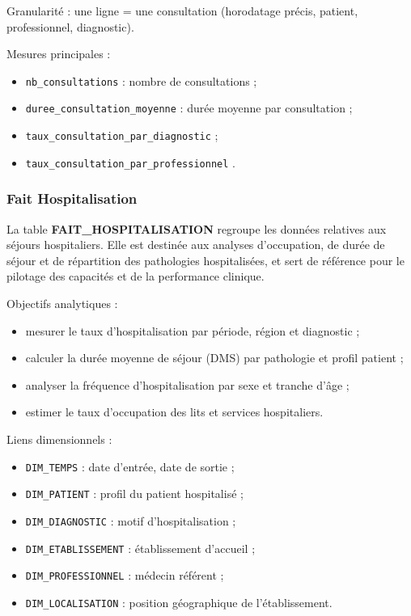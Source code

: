 \documentclass[12pt,a4paper]{article}
\begin{document}
Granularité : une ligne = une consultation (horodatage précis, patient, professionnel, diagnostic).

Mesures principales :
\begin{itemize}
    \item \texttt{nb\_consultations} : nombre de consultations ;
    \item \texttt{duree\_consultation\_moyenne} : durée moyenne par consultation ;
    \item \texttt{taux\_consultation\_par\_diagnostic} ;
    \item \texttt{taux\_consultation\_par\_professionnel} .
\end{itemize}

\subsubsection{Fait Hospitalisation}

La table \textbf{FAIT\_HOSPITALISATION} regroupe les données relatives aux séjours hospitaliers. Elle est destinée aux analyses d’occupation, de durée de séjour et de répartition des pathologies hospitalisées, et sert de référence pour le pilotage des capacités et de la performance clinique.

Objectifs analytiques :
\begin{itemize}
    \item mesurer le taux d’hospitalisation par période, région et diagnostic ;
    \item calculer la durée moyenne de séjour (DMS) par pathologie et profil patient ;
    \item analyser la fréquence d’hospitalisation par sexe et tranche d’âge ;
    \item estimer le taux d’occupation des lits et services hospitaliers.
\end{itemize}

Liens dimensionnels :
\begin{itemize}
    \item \texttt{DIM\_TEMPS} : date d’entrée, date de sortie ;
    \item \texttt{DIM\_PATIENT} : profil du patient hospitalisé ;
    \item \texttt{DIM\_DIAGNOSTIC} : motif d’hospitalisation ;
    \item \texttt{DIM\_ETABLISSEMENT} : établissement d’accueil ;
    \item \texttt{DIM\_PROFESSIONNEL} : médecin référent ;
    \item \texttt{DIM\_LOCALISATION} : position géographique de l’établissement.
\end{itemize}
\end{document}
